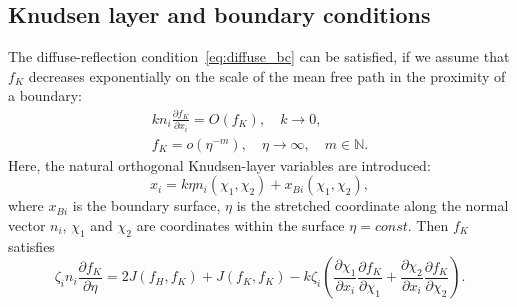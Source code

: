 \documentclass[10pt]{article}
\newcommand{\pder}[2][]{\frac{\partial#1}{\partial#2}}
\newcommand{\OO}[1]{O(#1)}
\newcommand{\oo}[1]{o(#1)}
\begin{document}
\subsection{Knudsen layer and boundary conditions}

The diffuse-reflection condition~\eqref{eq:diffuse_bc} can be satisfied,
if we assume that \(f_K\) decreases exponentially on the scale of the mean free path in the proximity of a boundary:
\begin{gather}
    k n_i\pder[f_K]{x_i} = \OO{f_K}, \quad k\to0, \label{eq:knlayer_sharp}\\
    f_K = \oo{\eta^{-m}}, \quad \eta\to\infty, \quad m\in\mathbb{N}. \label{eq:knlayer_exp}
\end{gather}
Here, the natural orthogonal Knudsen-layer variables are introduced:
\begin{equation}\label{eq:eta_definition}
    x_i = k\eta n_i(\chi_1,\chi_2) + x_{Bi}(\chi_1,\chi_2),
\end{equation}
where \(x_{Bi}\) is the boundary surface, \(\eta\) is the stretched coordinate along the normal vector \(n_i\),
\(\chi_1\) and \(\chi_2\) are coordinates within the surface \(\eta=const\).
Then \(f_K\) satisfies
\begin{equation}\label{eq:fK_equation}
    \zeta_in_i\pder[f_K]{\eta} = 2J(f_H,f_K) + J(f_K,f_K)
    - k\zeta_i\left(\pder[\chi_1]{x_i}\pder[f_K]{\chi_1} + \pder[\chi_2]{x_i}\pder[f_K]{\chi_2}\right).
\end{equation}
\end{document}
